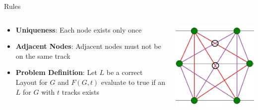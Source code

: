\documentclass[hyperref={pdfpagelabels=false},aspectratio=169]{beamer}
\theoremstyle{definition}
\begin{document}
\begin{frame}{Rules}
\begin{columns}
    \begin{column}{0.5\textwidth}
        \begin{itemize}
            \item \textbf{Uniqueness}: Each node exists only once
            \item \textbf{Adjacent Nodes}: Adjacent nodes must not be on the same track
            \item \textbf{Problem Definition}: Let $L$ be a correct Layout for $G$ and $F(G, t)$ evaluate to true if an $L$ for $G$ with $t$ tracks exists
        \end{itemize}
    \end{column}
    \begin{column}{0.5\textwidth}
        \vspace{2cm}
        \includegraphics[scale=0.6]{img/Regeln_2.png}
    \end{column}
\end{columns}
\end{frame}
\end{document}
